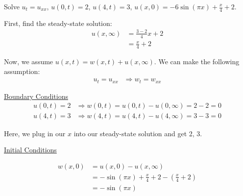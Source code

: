 Solve $u_t = u_{xx}$, $u(0, t) = 2$, $u(4, t) = 3$, $u(x, 0) = -6 \sin(\pi x) + \frac{x}{4} + 2$.

First, find the steady-state solution:
%
\begin{align}
  u(x, \infty) & = \frac{3 - 2}{4} x + 2\\
  & = \frac{x}{4} + 2
\end{align}

Now, we assume $u(x, t) = w(x, t) + u(x, \infty)$. We can make the following assumption:
%
\begin{align}
  u_t = u_{xx} & \Rightarrow w_t = w_{xx}
\end{align}

\underline{Boundary Conditions}
\begin{align}
  u(0, t) = 2 & \Rightarrow w(0, t) = u(0, t) - u(0, \infty) = 2 - 2 = 0\\
  u(4, t) = 3 & \Rightarrow w(4, t) = u(4, t) - u(4, \infty) = 3 - 3 = 0
\end{align}

Here, we plug in our $x$ into our steady-state solution and get 2, 3.

\underline{Initial Conditions}

\begin{align}
  w(x, 0) & = u(x, 0) - u(x, \infty)\\
  & = -\sin(\pi x) + \frac{x}{4} + 2 - \left(\frac{x}{4} + 2\right)\\
  & = -\sin(\pi x)
\end{align}

